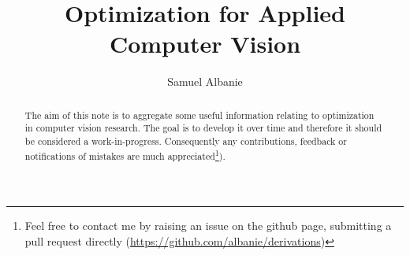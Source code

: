 \documentclass[11pt,openany]{memoir}
\title{Optimization for Applied Computer Vision}
\author{
Samuel Albanie
}
\date{}
\begin{document}


\frontmatter
\maketitle{}

\begin{abstract}
The aim of this note is to aggregate some useful information relating to optimization in computer vision research.
The goal is to develop it over time and therefore it should be considered a work-in-progress.  Consequently any contributions, feedback or notifications of mistakes are much appreciated\footnote{Feel free to contact me by raising an issue on the github page, submitting a pull request directly (\mbox{\url{https://github.com/albanie/derivations})}}).
\end{abstract}
\clearpage

\tableofcontents*
\clearpage

\mainmatter





\end{document}
